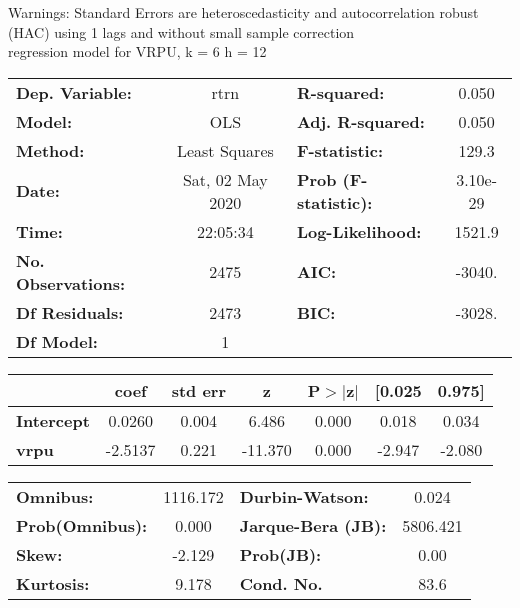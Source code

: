 Warnings: \newline
 [1] Standard Errors are heteroscedasticity and autocorrelation robust (HAC) using 1 lags and without small sample correction\\ 

regression model for VRPU, k = 6 h = 12\begin{center}
\begin{tabular}{lclc}
\toprule
\textbf{Dep. Variable:}    &       rtrn       & \textbf{  R-squared:         } &     0.050   \\
\textbf{Model:}            &       OLS        & \textbf{  Adj. R-squared:    } &     0.050   \\
\textbf{Method:}           &  Least Squares   & \textbf{  F-statistic:       } &     129.3   \\
\textbf{Date:}             & Sat, 02 May 2020 & \textbf{  Prob (F-statistic):} &  3.10e-29   \\
\textbf{Time:}             &     22:05:34     & \textbf{  Log-Likelihood:    } &    1521.9   \\
\textbf{No. Observations:} &        2475      & \textbf{  AIC:               } &    -3040.   \\
\textbf{Df Residuals:}     &        2473      & \textbf{  BIC:               } &    -3028.   \\
\textbf{Df Model:}         &           1      & \textbf{                     } &             \\
\bottomrule
\end{tabular}
\begin{tabular}{lcccccc}
                   & \textbf{coef} & \textbf{std err} & \textbf{z} & \textbf{P$> |$z$|$} & \textbf{[0.025} & \textbf{0.975]}  \\
\midrule
\textbf{Intercept} &       0.0260  &        0.004     &     6.486  &         0.000        &        0.018    &        0.034     \\
\textbf{vrpu}      &      -2.5137  &        0.221     &   -11.370  &         0.000        &       -2.947    &       -2.080     \\
\bottomrule
\end{tabular}
\begin{tabular}{lclc}
\textbf{Omnibus:}       & 1116.172 & \textbf{  Durbin-Watson:     } &    0.024  \\
\textbf{Prob(Omnibus):} &   0.000  & \textbf{  Jarque-Bera (JB):  } & 5806.421  \\
\textbf{Skew:}          &  -2.129  & \textbf{  Prob(JB):          } &     0.00  \\
\textbf{Kurtosis:}      &   9.178  & \textbf{  Cond. No.          } &     83.6  \\
\bottomrule
\end{tabular}
\end{center}

